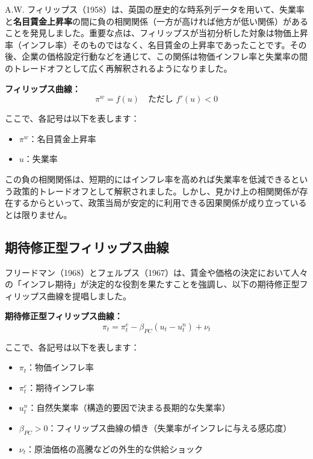 \documentclass[
  japanese,
  lualatex,
  ja=standard,
  12pt,
  a4paper]{ltjsarticle}
\providecommand{\tightlist}{%
  \setlength{\itemsep}{0pt}\setlength{\parskip}{0pt}}
\begin{document}
A.W.
フィリップス（1958）は、英国の歴史的な時系列データを用いて、失業率と\textbf{名目賃金上昇率}の間に負の相関関係（一方が高ければ他方が低い関係）があることを発見しました。重要な点は、フィリップスが当初分析した対象は物価上昇率（インフレ率）そのものではなく、名目賃金の上昇率であったことです。その後、企業の価格設定行動などを通じて、この関係は物価インフレ率と失業率の間のトレードオフとして広く再解釈されるようになりました。

\textbf{フィリップス曲線：} \[
\pi^w = f(u) \quad \text{ただし } f'(u) < 0
\]

ここで、各記号は以下を表します：

\begin{itemize}
\tightlist
\item
  \(\pi^w\)：名目賃金上昇率
\item
  \(u\)：失業率
\end{itemize}

この負の相関関係は、短期的にはインフレ率を高めれば失業率を低減できるという政策的トレードオフとして解釈されました。しかし、見かけ上の相関関係が存在するからといって、政策当局が安定的に利用できる因果関係が成り立っているとは限りません。

\subsection{期待修正型フィリップス曲線}\label{ux671fux5f85ux4feeux6b63ux578bux30d5ux30a3ux30eaux30c3ux30d7ux30b9ux66f2ux7dda}

フリードマン（1968）とフェルプス（1967）は、賃金や価格の決定において人々の「インフレ期待」が決定的な役割を果たすことを強調し、以下の期待修正型フィリップス曲線を提唱しました。

\textbf{期待修正型フィリップス曲線：} \[
\pi_t = \pi_t^e - \beta_{PC}(u_t - u_t^n)+\nu_t
\]

ここで、各記号は以下を表します：

\begin{itemize}
\tightlist
\item
  \(\pi_t\)：物価インフレ率
\item
  \(\pi_t^e\)：期待インフレ率
\item
  \(u_t^n\)：自然失業率（構造的要因で決まる長期的な失業率）
\item
  \(\beta_{PC} > 0\)：フィリップス曲線の傾き（失業率がインフレに与える感応度）
\item
  \(\nu_t\)：原油価格の高騰などの外生的な供給ショック
\end{itemize}
\end{document}
